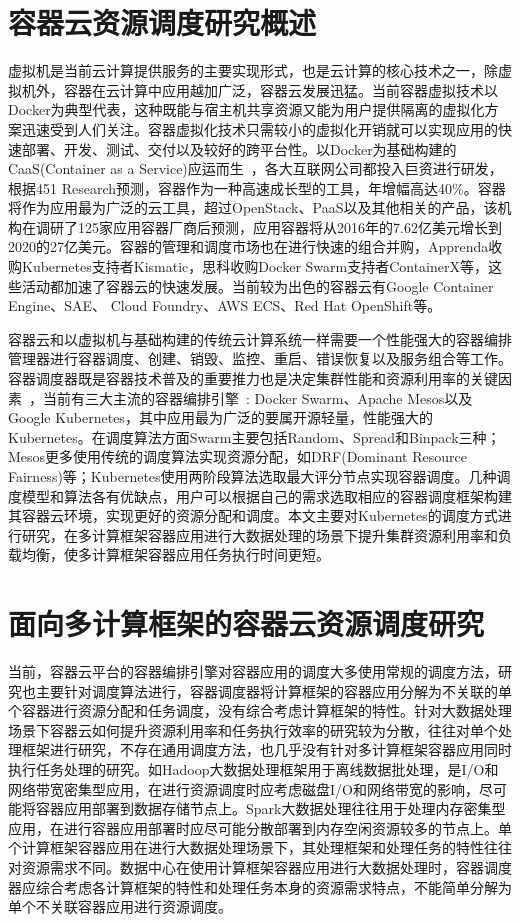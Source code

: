 \section{容器云资源调度研究概述}
虚拟机是当前云计算提供服务的主要实现形式，也是云计算的核心技术之一，除虚拟机外，容器在云计算中应用越加广泛，容器云发展迅猛。当前容器虚拟技术以Docker为典型代表，这种既能与宿主机共享资源又能为用户提供隔离的虚拟化方案迅速受到人们关注。容器虚拟化技术只需较小的虚拟化开销就可以实现应用的快速部署、开发、测试、交付以及较好的跨平台性。以Docker为基础构建的CaaS(Container as a Service)应运而生~\cite{Kozhirbayev2017A}，各大互联网公司都投入巨资进行研发，根据451 Research预测，容器作为一种高速成长型的工具，年增幅高达40\%。容器将作为应用最为广泛的云工具，超过OpenStack、PaaS以及其他相关的产品，该机构在调研了125家应用容器厂商后预测，应用容器将从2016年的7.62亿美元增长到2020的27亿美元。容器的管理和调度市场也在进行快速的组合并购，Apprenda收购Kubernetes支持者Kismatic，思科收购Docker Swarm支持者ContainerX等，这些活动都加速了容器云的快速发展。当前较为出色的容器云有Google Container Engine、SAE、 Cloud Foundry、AWS ECS、Red Hat OpenShift等。

容器云和以虚拟机与基础构建的传统云计算系统一样需要一个性能强大的容器编排管理器进行容器调度、创建、销毁、监控、重启、错误恢复以及服务组合等工作。容器调度器既是容器技术普及的重要推力也是决定集群性能和资源利用率的关键因素~\cite{Application2017}，当前有三大主流的容器编排引擎~\cite{Usman2016}: Docker Swarm、Apache Mesos以及Google Kubernetes，其中应用最为广泛的要属开源轻量，性能强大的Kubernetes。在调度算法方面Swarm主要包括Random、Spread和Binpack三种；Mesos更多使用传统的调度算法实现资源分配，如DRF(Dominant Resource Fairness)等；Kubernetes使用两阶段算法选取最大评分节点实现容器调度。几种调度模型和算法各有优缺点，用户可以根据自己的需求选取相应的容器调度框架构建其容器云环境，实现更好的资源分配和调度。本文主要对Kubernetes的调度方式进行研究，在多计算框架容器应用进行大数据处理的场景下提升集群资源利用率和负载均衡，使多计算框架容器应用任务执行时间更短。

\section{面向多计算框架的容器云资源调度研究}
当前，容器云平台的容器编排引擎对容器应用的调度大多使用常规的调度方法，研究也主要针对调度算法进行，容器调度器将计算框架的容器应用分解为不关联的单个容器进行资源分配和任务调度，没有综合考虑计算框架的特性。针对大数据处理场景下容器云如何提升资源利用率和任务执行效率的研究较为分散，往往对单个处理框架进行研究，不存在通用调度方法，也几乎没有针对多计算框架容器应用同时执行任务处理的研究。如Hadoop大数据处理框架用于离线数据批处理，是I/O和网络带宽密集型应用，在进行资源调度时应考虑磁盘I/O和网络带宽的影响，尽可能将容器应用部署到数据存储节点上。Spark大数据处理往往用于处理内存密集型应用，在进行容器应用部署时应尽可能分散部署到内存空闲资源较多的节点上。单个计算框架容器应用在进行大数据处理场景下，其处理框架和处理任务的特性往往对资源需求不同。数据中心在使用计算框架容器应用进行大数据处理时，容器调度器应综合考虑各计算框架的特性和处理任务本身的资源需求特点，不能简单分解为单个不关联容器应用进行资源调度。

